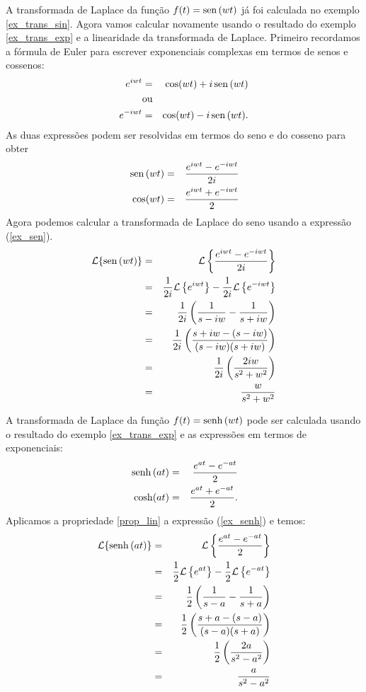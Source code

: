 \begin{ex}{\label{ex_trans_sin_2}} A transformada de Laplace da função $f(t)=\operatorname{sen}\,(wt)$ já foi calculada no exemplo \ref{ex_trans_sin}. Agora vamos calcular novamente usando o resultado do exemplo \ref{ex_trans_exp} e a linearidade da transformada de Laplace. Primeiro recordamos a fórmula de Euler para escrever exponenciais complexas em termos de senos e cossenos:
\begin{eqnarray*}
e^{iwt}&=&\cos(wt)+i\operatorname{sen}\,(wt)\\
&\hbox{ou}&\\
e^{-iwt}&=&\cos(wt)-i\operatorname{sen}\,(wt) .
\end{eqnarray*}
As duas expressões podem ser resolvidas em termos do seno e do cosseno para obter
\begin{eqnarray}
{\label{ex_sen}} \operatorname{sen}\,(wt)&=&\frac{e^{iwt}-e^{-iwt}}{2i}\\
{\label{ex_cos}} \cos(wt)&=&\frac{e^{iwt}+e^{-iwt}}{2}
\end{eqnarray} 
Agora podemos calcular a transformada de Laplace do seno usando a expressão (\ref{ex_sen}).
\begin{eqnarray*}
\mathcal{L }\{\operatorname{sen}\,(wt)\}&=&\mathcal{L }\left\{\frac{e^{iwt}-e^{-iwt}}{2i}\right\}\\
&=&\frac{1}{2i} \mathcal{L }\left\{ e^{iwt}\right\}-\frac{1}{2i} \mathcal{L }\left\{ e^{-iwt}\right\}\\
&=&\frac{1}{2i}\left( \frac{1}{s-iw}- \frac{1}{s+iw}\right)\\
&=&\frac{1}{2i}\left( \frac{s+iw-(s-iw)}{(s-iw)(s+iw)}\right)\\
&=&\frac{1}{2i}\left( \frac{2iw}{s^2+w^2}\right)\\
&=&\frac{w}{s^2+w^2}
\end{eqnarray*} 
\end{ex}
\begin{ex} A transformada de Laplace da função $f(t)=\operatorname{senh}\,(wt)$ pode ser calculada usando o resultado do exemplo \ref{ex_trans_exp} e as expressões em termos de exponenciais:
\begin{eqnarray}
{\label{ex_senh}} \operatorname{senh}\,(at)&=&\frac{e^{at}-e^{-at}}{2}\\
{\label{ex_cosh}} \cosh(at)&=&\frac{e^{at}+e^{-at}}{2}.
\end{eqnarray} 
Aplicamos a propriedade \ref{prop_lin} a expressão (\ref{ex_senh}) e temos:
\begin{eqnarray*}
\mathcal{L }\{\operatorname{senh}\,(at)\}&=&\mathcal{L }\left\{\frac{e^{at}-e^{-at}}{2}\right\}\\
&=&\frac{1}{2} \mathcal{L }\left\{ e^{at}\right\}-\frac{1}{2} \mathcal{L }\left\{ e^{-at}\right\}\\
&=&\frac{1}{2}\left( \frac{1}{s-a}- \frac{1}{s+a}\right)\\
&=&\frac{1}{2}\left( \frac{s+a-(s-a)}{(s-a)(s+a)}\right)\\
&=&\frac{1}{2}\left( \frac{2a}{s^2-a^2}\right)\\
&=&\frac{a}{s^2-a^2}
\end{eqnarray*} 
\end{ex}
